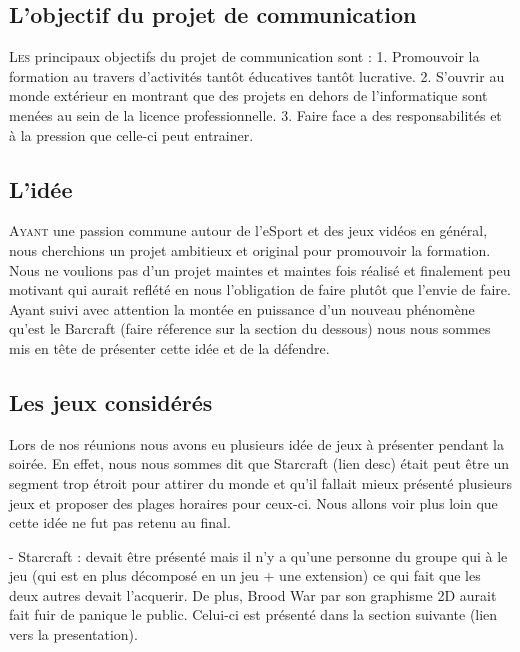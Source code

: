 \subsection{L'objectif du projet de communication}%
\label{sub:l_objectif_du_projet_de_communication}

\lettrine{L}{es} principaux objectifs du projet de communication sont : 1. Promouvoir
la formation au travers d'activités tantôt éducatives tantôt lucrative.
2. S'ouvrir au monde extérieur en montrant que des projets en dehors de
l'informatique sont menées au sein de la licence professionnelle.  3.
Faire face a des responsabilités et à la pression que celle-ci peut
entrainer.

\subsection{L'idée}%
\label{sub:l_idee}

\lettrine{A}{yant} une passion commune autour de l'eSport et des jeux
vidéos en général, nous cherchions un projet ambitieux et original
pour promouvoir la formation. Nous ne voulions pas d'un projet maintes
et maintes fois réalisé et finalement peu motivant qui aurait
reflété en nous l'obligation de faire plutôt que l'envie de faire.
Ayant suivi avec attention la montée en puissance d'un nouveau
phénomène qu'est le Barcraft (faire réference sur la section du
dessous) nous nous sommes mis en tête de présenter cette idée et de la
défendre.

\subsection{Les jeux considérés}%
\label{sub:les_jeux_consideres}

Lors de nos réunions nous avons eu plusieurs idée de jeux à présenter
pendant la soirée. En effet, nous nous sommes dit que Starcraft (lien
desc) était peut être un segment trop étroit pour attirer du monde et
qu'il fallait mieux présenté plusieurs jeux et proposer des plages
horaires pour ceux-ci. Nous allons voir plus loin que cette idée ne fut
pas retenu au final.

- Starcraft : devait être présenté mais il n'y a qu'une personne du
groupe qui à le jeu (qui est en plus décomposé en un jeu + une
extension) ce qui fait que les deux autres devait l'acquerir. De
plus, Brood War par son graphisme 2D aurait fait fuir de panique le
public. Celui-ci est présenté dans la section suivante (lien vers la
presentation).

